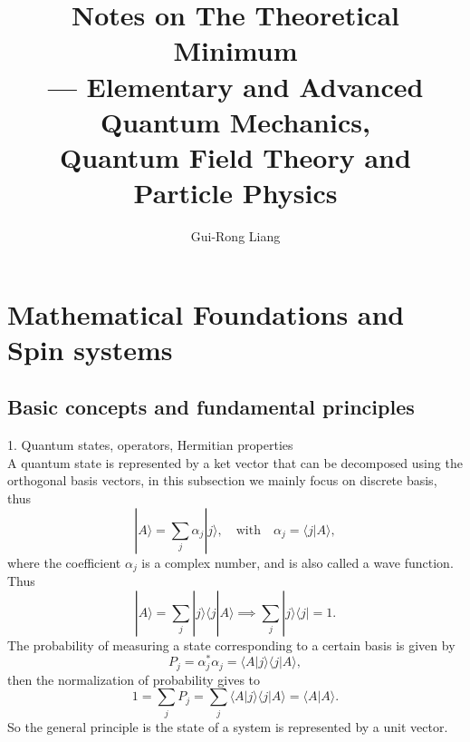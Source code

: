 \documentclass{article}
\title{Notes on The Theoretical Minimum\\
--- Elementary and Advanced Quantum Mechanics,\\ Quantum Field Theory and Particle Physics}
\author{Gui-Rong Liang}
\newcommand{\be}{\begin{equation}}
\newcommand{\ee}{\end{equation}}
\renewcommand{\1}{\left}
\renewcommand{\2}{\right}
\newcommand{\la}{\langle}
\newcommand{\ra}{\rangle}
\newcommand{\al}{\alpha}
\begin{document}
\maketitle
\tableofcontents

\newpage

\section{Mathematical Foundations and Spin systems}
\subsection{Basic concepts and fundamental principles}
1. Quantum states, operators, Hermitian properties\\

A quantum state is represented by a ket vector that can be decomposed using the orthogonal basis vectors, in this subsection we mainly focus on discrete basis, thus 
\be
|A\ra=\sum_j \al_j|j\ra, \quad\text{with} \quad \al_j=\la j|A\ra,
\ee
where the coefficient $\al_j$ is a complex number, and is also called a wave function. Thus
\be
|A\ra=\sum_j |j\ra \la j|A\ra \implies  \sum_j |j\ra \la j|=1.
\ee
The probability of measuring a state corresponding to a certain basis is given by
\be
P_j=\al_j^*\al_j=\la A |j\ra \la j|A\ra,
\ee
then the normalization of probability gives to 
\be
1=\sum_j P_j=\sum_j\la A |j\ra \la j|A\ra=\la A|A\ra.
\ee
So the general principle is the state of a system is represented by a unit vector.\\
\end{document}
